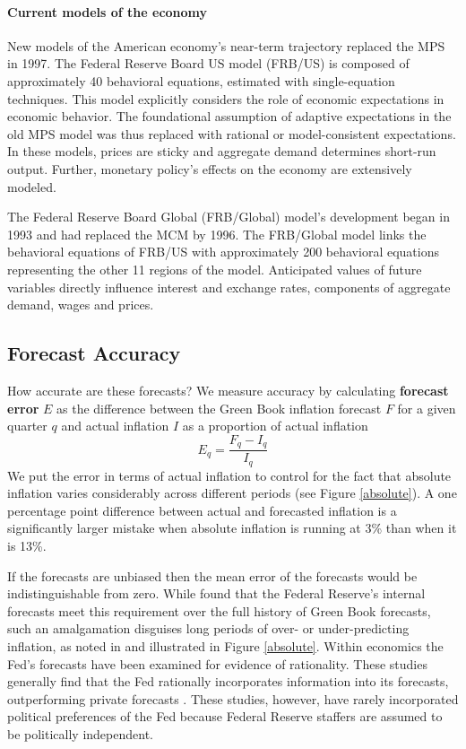\documentclass[a4paper]{article}
\begin{document}
\paragraph{Current models of the economy}
New models of the American economy's near-term trajectory replaced the MPS in 1997. The Federal Reserve Board US model (FRB/US) is composed of approximately 40 behavioral equations, estimated with single-equation techniques. This model explicitly considers the role of economic expectations in economic behavior. The foundational assumption of adaptive expectations in the old MPS model was thus replaced with rational or model-consistent expectations. In these models, prices are sticky and aggregate demand determines short-run output. Further, monetary policy's effects on the economy are extensively modeled. 

The Federal Reserve Board Global (FRB/Global) model's development began in 1993 and had replaced the MCM by 1996. The FRB/Global model links the behavioral equations of FRB/US with approximately 200 behavioral equations representing the other 11 regions of the model. Anticipated values of future variables directly influence interest and exchange rates, components of aggregate demand, wages and prices.

\subsection{Forecast Accuracy}\label{ForecastAcc}

How accurate are these forecasts? We measure accuracy by calculating {\bf{forecast error}} $E$ as the difference between the Green Book inflation forecast $F$ for a given quarter $q$ and actual inflation $I$ as a proportion of actual inflation
%
\begin{equation}
    E_{q} = \frac{F_{q} - I_{q}}{I_{q}}
\end{equation}
%
We put the error in terms of actual inflation to control for the fact that absolute inflation varies considerably across different periods (see Figure \ref{absolute}). A one percentage point difference between actual and forecasted inflation is a significantly larger mistake when absolute inflation is running at 3\% than when it is 13\%. 

If the forecasts are unbiased then the mean error of the forecasts would be indistinguishable from zero. While \cite{Romer2000} found that the Federal Reserve's internal forecasts  meet this requirement over the full history of Green Book forecasts, such an amalgamation disguises long periods of over- or under-predicting inflation, as noted in \cite{Capistran2006} and illustrated in Figure \ref{absolute}. Within economics the Fed's forecasts have been examined for evidence of rationality. These studies generally find that the Fed rationally incorporates information into its forecasts, outperforming private forecasts \cite[c.f.][]{Gamber2009}. These studies, however, have rarely incorporated political preferences of the Fed because Federal Reserve staffers are assumed to be politically independent.
\end{document}
